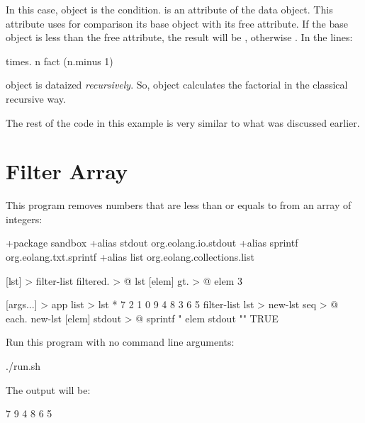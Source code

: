 \documentclass[12pt]{book}
\begin{document}
In this case, object  is the condition.  is an attribute of the  data object. This attribute uses for comparison its base object with its free attribute. If the base object is less than the free attribute, the result will be , otherwise .  In the lines:
\begin{ffcode}
times.
  n
  fact (n.minus 1)
\end{ffcode}
object  is dataized \textit{recursively}. So, object   calculates the factorial in the classical recursive way.

The rest of the code in this example is very similar to what was discussed earlier.

\section{Filter Array}

This program removes numbers that  are less than or equals to  from an array of integers:

\begin{ffcode}
+package sandbox
+alias stdout org.eolang.io.stdout
+alias sprintf org.eolang.txt.sprintf
+alias list org.eolang.collections.list

[lst] > filter-list
  filtered. > @
    lst
    [elem]
      gt. > @
        elem
        3

[args...] > app
  list > lst
    * 7 2 1 0 9 4 8 3 6 5
  filter-list lst > new-lst
  seq > @
    each.
      new-lst
      [elem]
        stdout > @
          sprintf
            "%
            elem
    stdout "\n"
    TRUE

\end{ffcode}

Run this program  with no command line arguments:
\begin{ffcode}
./run.sh
\end{ffcode}
The output will be:
\begin{ffcode}
7 9 4 8 6 5
\end{ffcode}
\end{document}
